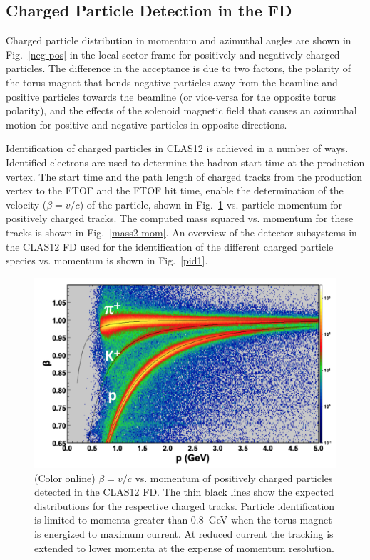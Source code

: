 \documentclass[final,3p,twocolumn]{elsarticle}
\begin{document}
\subsection{Charged Particle Detection in the FD}
 
Charged particle distribution in momentum and azimuthal angles are shown in Fig.~\ref{neg-pos} in the local sector
frame for positively and negatively charged particles. The difference in the acceptance is due to two factors, the
polarity of the torus magnet that bends negative particles away from the beamline and positive particles towards
the beamline (or vice-versa for the opposite torus polarity), and the effects of the solenoid magnetic field that
causes an azimuthal motion for positive and negative particles in opposite directions. 


Identification of charged particles in CLAS12 is achieved in a number of ways. Identified electrons are used
to determine the hadron start time at the production vertex. The start time and the path length of charged
tracks from the production vertex to the FTOF and the FTOF hit time, enable the determination of the
velocity ($\beta = v/c$) of the particle, shown in Fig.~\ref{pid} vs. particle momentum for positively charged
tracks. The computed mass squared vs. momentum for these tracks is shown in Fig.~\ref{mass2-mom}. An
overview of the detector subsystems in the CLAS12 FD used for the identification of the different charged
particle species vs. momentum is shown in Fig.~\ref{pid1}. 

\begin{figure}[ht!]
\centerline{\includegraphics[width=1.0\columnwidth]{FTOF1b_pid.png}}
\caption{(Color online) $\beta = v/c $ vs. momentum of positively charged particles detected in the CLAS12 FD.
  The thin black lines show the expected distributions for the respective charged tracks. Particle identification
  is limited to momenta greater than 0.8~GeV when the torus magnet is energized to maximum current. At
  reduced current the tracking is extended to lower momenta at the expense of momentum resolution.}
\label{pid}
\end{figure} 
\end{document}
